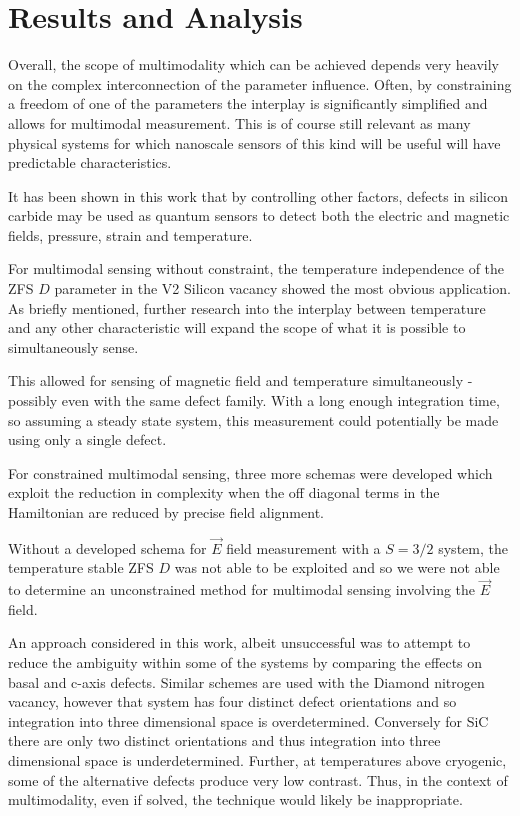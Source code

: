 \chapter{Results and Analysis}\label{ch:results}

Overall, the scope of multimodality which can be achieved depends very heavily on the complex interconnection of the parameter influence. Often, by constraining a freedom of one of the parameters the interplay is significantly simplified and allows for multimodal measurement. This is of course still relevant as many physical systems for which nanoscale sensors of this kind will be useful will have predictable characteristics. 

It has been shown in this work that by controlling other factors, defects in silicon carbide may be used as quantum sensors to detect both the electric and magnetic fields, pressure, strain and temperature. 

For multimodal sensing without constraint, the temperature independence of the ZFS $D$ parameter in the V2 Silicon vacancy showed the most obvious application. As briefly mentioned, further research into the interplay between temperature and any other characteristic will expand the scope of what it is possible to simultaneously sense. 

This allowed for sensing of magnetic field and temperature simultaneously - possibly even with the same defect family. With a long enough integration time, so assuming a steady state system, this measurement could potentially be made using only a single defect.

For constrained multimodal sensing, three more schemas were developed which exploit the reduction in complexity when the off diagonal terms in the Hamiltonian are reduced by precise field alignment. 


Without a developed schema for $\vec{E}$ field measurement with a $S=3/2$ system, the temperature stable ZFS $D$ was not able to be exploited and so we were not able to determine an unconstrained method for multimodal sensing involving the $\vec{E}$ field. 

An approach considered in this work, albeit unsuccessful was to attempt to reduce the ambiguity within some of the systems by comparing the effects on basal and c-axis defects. Similar schemes are used with the Diamond nitrogen vacancy, however that system has four distinct defect orientations and so integration into three dimensional space is overdetermined. Conversely for SiC there are only two distinct orientations and thus integration into three dimensional space is underdetermined. Further, at temperatures above cryogenic, some of the alternative defects produce very low contrast. Thus, in the context of multimodality, even if solved, the technique would likely be inappropriate. 


